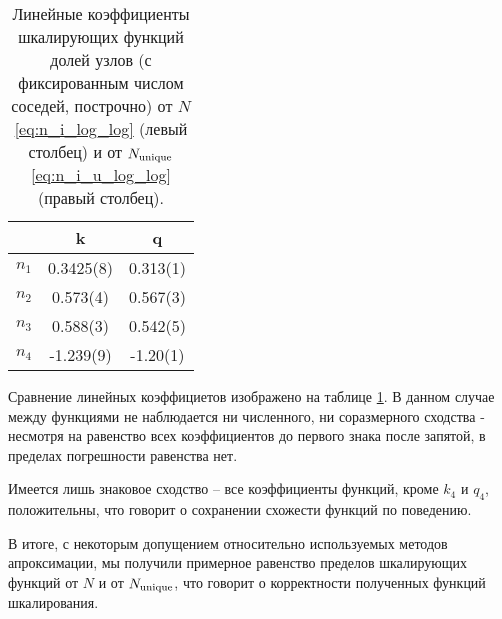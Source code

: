 \begin{table}[h]
\centering
\begin{tabular}{|c|c|c|}
\hline
 & k & q \\ \hline
$n_1$ & 0.3425(8) &  0.313(1) \\ \hline
$n_2$ & 0.573(4) & 0.567(3) \\ \hline
$n_3$ & 0.588(3) & 0.542(5) \\ \hline
$n_4$ & -1.239(9) & -1.20(1) \\ \hline
\end{tabular}
\caption{Линейные коэффициенты шкалирующих функций долей узлов (с фиксированным числом соседей, построчно) от $N$ \eqref{eq:n_i_log_log} (левый столбец) и от $N_{\textup{unique}}$ \eqref{eq:n_i_u_log_log} (правый столбец).}
\label{tab:kq_compare}
\end{table}

Сравнение линейных коэффициетов изображено на таблице \ref{tab:kq_compare}. 
В данном случае между функциями не наблюдается ни численного, ни соразмерного сходства - несмотря на равенство всех коэффициентов до первого знака после запятой, в пределах погрешности равенства нет.

Имеется лишь знаковое сходство -- все коэффициенты функций, кроме $k_4$ и $q_4$, положительны, что говорит о сохранении схожести функций по поведению.

В итоге, с некоторым допущением относительно используемых методов апроксимации, мы получили примерное равенство пределов шкалирующих функций от $N$ и от $N_{\textup{unique}}$, что говорит о корректности полученных функций шкалирования.


\newpage